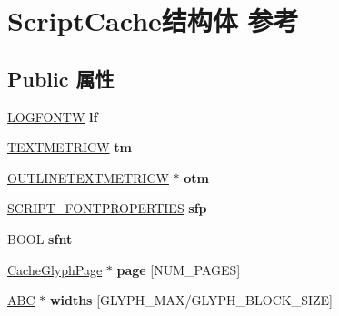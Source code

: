 \hypertarget{struct_script_cache}{}\section{Script\+Cache结构体 参考}
\label{struct_script_cache}
\subsection*{Public 属性}
\begin{DoxyCompactItemize}
\item 
\mbox{\label{struct_script_cache_aba280d5c0fdc2d8e4cfd30074079b2c8}} 
\hyperlink{struct_l_o_g_f_o_n_t_w}{L\+O\+G\+F\+O\+N\+TW} {\bfseries lf}
\item 
\mbox{\label{struct_script_cache_af190898f4b131ef29c29c839258c2663}} 
\hyperlink{structtag_t_e_x_t_m_e_t_r_i_c_w}{T\+E\+X\+T\+M\+E\+T\+R\+I\+CW} {\bfseries tm}
\item 
\mbox{\label{struct_script_cache_a13bd71abfd368c8c277818886c4baa3b}} 
\hyperlink{struct___o_u_t_l_i_n_e_t_e_x_t_m_e_t_r_i_c_w}{O\+U\+T\+L\+I\+N\+E\+T\+E\+X\+T\+M\+E\+T\+R\+I\+CW} $\ast$ {\bfseries otm}
\item 
\mbox{\label{struct_script_cache_a3c3b40bda555a403a54e70e6bd334f8e}} 
\hyperlink{structtag___s_c_r_i_p_t___f_o_n_t_p_r_o_p_e_r_t_i_e_s}{S\+C\+R\+I\+P\+T\+\_\+\+F\+O\+N\+T\+P\+R\+O\+P\+E\+R\+T\+I\+ES} {\bfseries sfp}
\item 
\mbox{\label{struct_script_cache_ae7a810d6f49c3de9e5ad2e6dc0a0210d}} 
B\+O\+OL {\bfseries sfnt}
\item 
\mbox{\label{struct_script_cache_aa6eb40f3fadf566a8dfe59df0336c5bd}} 
\hyperlink{struct_cache_glyph_page}{Cache\+Glyph\+Page} $\ast$ {\bfseries page} \mbox{[}N\+U\+M\+\_\+\+P\+A\+G\+ES\mbox{]}
\item 
\mbox{\label{struct_script_cache_a525b4fa10504fe8aee06f04e76c86bb4}} 
\hyperlink{struct___a_b_c}{A\+BC} $\ast$ {\bfseries widths} \mbox{[}G\+L\+Y\+P\+H\+\_\+\+M\+AX/G\+L\+Y\+P\+H\+\_\+\+B\+L\+O\+C\+K\+\_\+\+S\+I\+ZE\mbox{]}
\item 

\end{DoxyCompactItemize}
